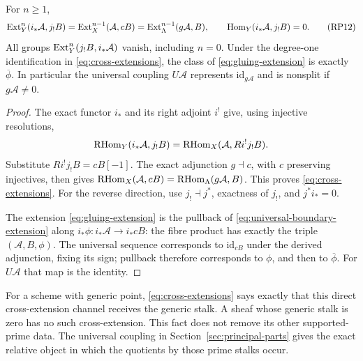 \begin{theorem}\label{thm:cross-ext}
For $n\ge1$,
\[
 \operatorname{Ext}_Y^n(i_*\mathcal A,j_!B)
 =\operatorname{Ext}_X^{n-1}(\mathcal A,cB)
 =\operatorname{Ext}_\Lambda^{n-1}(g\mathcal A,B),
 \qquad\operatorname{Hom}_Y(i_*\mathcal A,j_!B)=0.
 \tag{RP12}\label{eq:cross-extensions}
\]
All groups $\operatorname{Ext}_Y^n(j_!B,i_*\mathcal A)$ vanish, including $n=0$.
Under the degree-one identification in \eqref{eq:cross-extensions},
the class of \eqref{eq:gluing-extension} is exactly $\overline\phi$.
In particular the universal coupling $U\mathcal A$ represents
$\mathrm{id}_{g\mathcal A}$ and is nonsplit if $g\mathcal A\ne0$.
\end{theorem}
\begin{proof}
The exact functor $i_*$ and its right adjoint $i^!$ give, using injective
resolutions,
\[
\operatorname{RHom}_Y(i_*\mathcal A,j_!B)=\operatorname{RHom}_X(\mathcal A,Ri^!j_!B).
\]
Substitute
$Ri^!j_!B=cB[-1]$. The exact adjunction $g\dashv c$, with $c$ preserving
injectives, then gives
$\operatorname{RHom}_X(\mathcal A,cB)=\operatorname{RHom}_\Lambda(g\mathcal A,B)$.
This proves \eqref{eq:cross-extensions}. For the reverse direction,
use $j_!\dashv j^*$, exactness of $j_!$, and $j^*i_*=0$.

The extension \eqref{eq:gluing-extension} is the pullback of
\eqref{eq:universal-boundary-extension} along
$i_*\phi:i_*\mathcal A\to i_*cB$: the fibre product has exactly the
triple $(\mathcal A,B,\phi)$. The universal sequence corresponds to
$\mathrm{id}_{cB}$ under the derived adjunction, fixing its sign;
pullback therefore corresponds to $\phi$, and then to
$\overline\phi$. For $U\mathcal A$ that map is the identity.
\end{proof}

For a scheme with generic point, \eqref{eq:cross-extensions} says exactly
that this direct cross-extension channel receives the generic stalk.
A sheaf whose generic stalk is zero has no such cross-extension.
This fact does not remove its other supported-prime data. The universal
coupling in Section~\ref{sec:principal-parts} gives the exact relative
object in which the quotients by those prime stalks occur.

